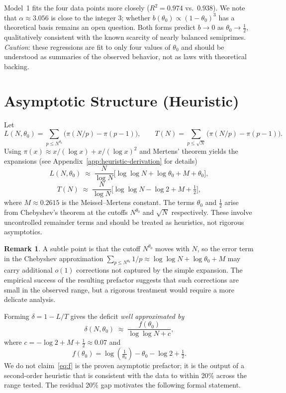 \documentclass[11pt]{article}
\theoremstyle{definition}
\newtheorem{remark}{Remark}
\begin{document}
Model~1 fits the four data points more closely (\(R^2 = 0.974\) vs.\ \(0.938\)).
We note that \(\alpha \approx 3.056\) is close to the integer \(3\); whether
\(b(\theta_0) \propto (1-\theta_0)^3\) has a theoretical basis remains an open question.
Both forms predict \(b \to 0\) as \(\theta_0 \to \tfrac{1}{2}\), qualitatively
consistent with the known scarcity of nearly balanced semiprimes.
\emph{Caution}: these regressions are fit to only four values of \(\theta_0\) and
should be understood as summaries of the observed behavior, not as laws with
theoretical backing.


\section{Asymptotic Structure (Heuristic)}
\label{sec:heuristic}

Let
\[
  L(N,\theta_0) = \sum_{p \le N^{\theta_0}} \bigl(\pi(N/p) - \pi(p-1)\bigr),
  \qquad
  T(N) = \sum_{p \le \sqrt{N}} \bigl(\pi(N/p) - \pi(p-1)\bigr).
\]
Using \(\pi(x) \approx x/(\log x) + x/(\log x)^2\) and Mertens' theorem yields the
expansions (see Appendix~\ref{app:heuristic-derivation} for details)
\[
  L(N,\theta_0) \;\approx\; \frac{N}{\log N}
  \bigl[\log\log N + \log\theta_0 + M + \theta_0\bigr],
\]
\[
  T(N) \;\approx\; \frac{N}{\log N}
  \bigl[\log\log N - \log 2 + M + \tfrac{1}{2}\bigr],
\]
where \(M \approx 0.2615\) is the Meissel--Mertens constant.  The terms \(\theta_0\)
and \(\tfrac{1}{2}\) arise from Chebyshev's theorem at the cutoffs \(N^{\theta_0}\)
and \(\sqrt{N}\) respectively.  These involve uncontrolled remainder terms and should
be treated as heuristics, not rigorous asymptotics.

\begin{remark}
A subtle point is that the cutoff \(N^{\theta_0}\) moves with \(N\), so the error
term in the Chebyshev approximation
\(\sum_{p \leq N^{\theta_0}} 1/p \approx \log\log N + \log\theta_0 + M\)
may carry additional \(o(1)\) corrections not captured by the simple expansion.
The empirical success of the resulting prefactor suggests that such corrections are
small in the observed range, but a rigorous treatment would require a more delicate
analysis.
\end{remark}

Forming \(\delta = 1 - L/T\) gives the deficit \emph{well approximated by}
\begin{equation}\label{eq:prefactor}
  \delta(N,\theta_0) \;\approx\;
  \frac{f(\theta_0)}{\log\log N + c},
\end{equation}
where \(c = -\log 2 + M + \tfrac{1}{2} \approx 0.07\) and
\begin{equation}\label{eq:f}
  f(\theta_0) = \log\!\left(\tfrac{1}{\theta_0}\right) - \theta_0 - \log 2
  + \tfrac{1}{2}.
\end{equation}
We do not claim~\eqref{eq:f} is the proven asymptotic prefactor; it is the output of
a second-order heuristic that is consistent with the data to within 20\% across the
range tested.  The residual 20\% gap motivates the following formal statement.
\end{document}
